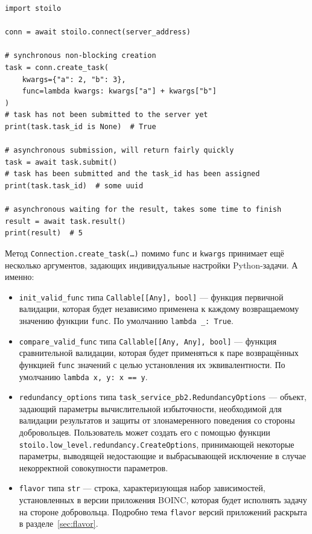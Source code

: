 \documentclass[a4paper,12pt]{extarticle}
\begin{document}
\begin{lstlisting}[caption={Пример создания и отправки задачи и получения результата с помощью низкоуровневого интерфейса stoilo.}, label={list:low_level}]
import stoilo

conn = await stoilo.connect(server_address)

# synchronous non-blocking creation
task = conn.create_task(
    kwargs={"a": 2, "b": 3},
    func=lambda kwargs: kwargs["a"] + kwargs["b"]
)
# task has not been submitted to the server yet
print(task.task_id is None)  # True

# asynchronous submission, will return fairly quickly
task = await task.submit()
# task has been submitted and the task_id has been assigned
print(task.task_id)  # some uuid

# asynchronous waiting for the result, takes some time to finish
result = await task.result()
print(result)  # 5
\end{lstlisting}

Метод \texttt{Connection.create\_task(\ldots)} помимо \texttt{func} и \texttt{kwargs} принимает ещё несколько аргументов, задающих индивидуальные настройки Python-задачи. А именно:
\begin{itemize}
    \item \texttt{init\_valid\_func} типа \texttt{Callable[[Any], bool]} — функция первичной валидации, которая будет независимо применена к каждому возвращаемому значению функции \texttt{func}. По умолчанию \texttt{lambda \_: True}.
    \item \texttt{compare\_valid\_func} типа \texttt{Callable[[Any, Any], bool]} — функция сравнительной валидации, которая будет применяться к паре возвращённых функцией \texttt{func} значений с целью установления их эквивалентности. По умолчанию \texttt{lambda x, y: x == y}.
    \item \texttt{redundancy\_options} типа \texttt{task\_service\_pb2.RedundancyOptions} — объект, задающий параметры вычислительной избыточности, необходимой для валидации результатов и защиты от злонамеренного поведения со стороны добровольцев. Пользователь может создать его с помощью функции \texttt{stoilo.low\_level.redundancy.CreateOptions}, принимающей некоторые параметры, выводящей недостающие и выбрасывающей исключение в случае некорректной совокупности параметров.
    \item \texttt{flavor} типа \texttt{str} — строка, характеризующая набор зависимостей, установленных в версии приложения BOINC, которая будет исполнять задачу на стороне добровольца. Подробно тема \texttt{flavor} версий приложений раскрыта в разделе~\ref{sec:flavor}.
\end{itemize}
\end{document}
